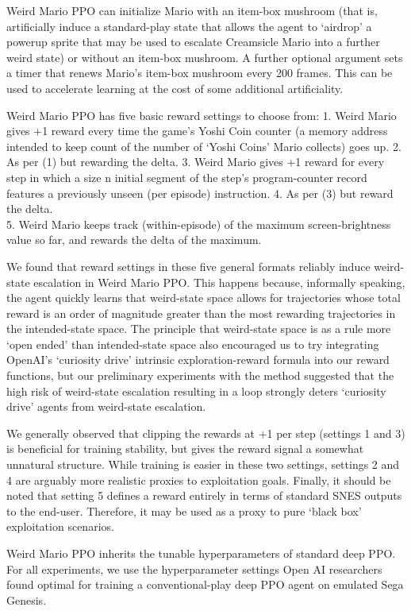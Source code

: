 \documentclass[]{article}
\begin{document}
Weird Mario PPO can initialize Mario with an item-box mushroom (that is,
artificially induce a standard-play state that allows the agent to
`airdrop' a powerup sprite that may be used to escalate Creamsicle Mario
into a further weird state) or without an item-box mushroom. A further
optional argument sets a timer that renews Mario's item-box mushroom
every 200 frames. This can be used to accelerate learning at the cost of
some additional artificiality.

Weird Mario PPO has five basic reward settings to choose from: 1. Weird
Mario gives +1 reward every time the game's Yoshi Coin counter (a memory
address intended to keep count of the number of `Yoshi Coins' Mario
collects) goes up. 2. As per (1) but rewarding the delta. 3. Weird Mario
gives +1 reward for every step in which a size n initial segment of the
step's program-counter record features a previously unseen (per episode)
instruction. 4. As per (3) but reward the delta.\\
5. Weird Mario keeps track (within-episode) of the maximum
screen-brightness value so far, and rewards the delta of the maximum.

We found that reward settings in these five general formats reliably
induce weird-state escalation in Weird Mario PPO. This happens because,
informally speaking, the agent quickly learns that weird-state space
allows for trajectories whose total reward is an order of magnitude
greater than the most rewarding trajectories in the intended-state
space. The principle that weird-state space is as a rule more `open
ended' than intended-state space also encouraged us to try integrating
OpenAI's `curiosity drive' intrinsic exploration-reward formula into our
reward functions, but our preliminary experiments with the method
suggested that the high risk of weird-state escalation resulting in a
loop strongly deters `curiosity drive' agents from weird-state
escalation.

We generally observed that clipping the rewards at +1 per step (settings
1 and 3) is beneficial for training stability, but gives the reward
signal a somewhat unnatural structure. While training is easier in these
two settings, settings 2 and 4 are arguably more realistic proxies to
exploitation goals. Finally, it should be noted that setting 5 defines a
reward entirely in terms of standard SNES outputs to the end-user.
Therefore, it may be used as a proxy to pure `black box' exploitation
scenarios.

Weird Mario PPO inherits the tunable hyperparameters of standard deep
PPO. For all experiments, we use the hyperparameter settings Open AI
researchers found optimal for training a conventional-play deep PPO
agent on emulated Sega Genesis.
\end{document}
